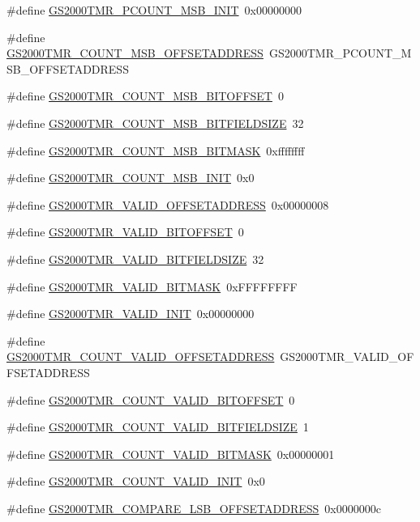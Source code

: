 \begin{DoxyCompactItemize}
\item 
\#define \hyperlink{a00556_aa39d9eade4210f59cf6828090fa58557}{GS2000TMR\_\-PCOUNT\_\-MSB\_\-INIT}~0x00000000
\item 
\#define \hyperlink{a00556_ad193092e1c4d20b72ce84f50c8e551c9}{GS2000TMR\_\-COUNT\_\-MSB\_\-OFFSETADDRESS}~GS2000TMR\_\-PCOUNT\_\-MSB\_\-OFFSETADDRESS
\item 
\#define \hyperlink{a00556_a5053f552dc3042575a61fa80cef0ed3a}{GS2000TMR\_\-COUNT\_\-MSB\_\-BITOFFSET}~0
\item 
\#define \hyperlink{a00556_ab89ff4e77dde1124c1d7d03d6a63b051}{GS2000TMR\_\-COUNT\_\-MSB\_\-BITFIELDSIZE}~32
\item 
\#define \hyperlink{a00556_a170d13990b2af824f361f5be63952c7e}{GS2000TMR\_\-COUNT\_\-MSB\_\-BITMASK}~0xffffffff
\item 
\#define \hyperlink{a00556_af41c5c250f6bf3c7a6eae0c9c0265d4c}{GS2000TMR\_\-COUNT\_\-MSB\_\-INIT}~0x0
\item 
\#define \hyperlink{a00556_a498c965135be6d53c8376d963b3ea397}{GS2000TMR\_\-VALID\_\-OFFSETADDRESS}~0x00000008
\item 
\#define \hyperlink{a00556_a38f4ead0a7a7c7c6d6c0b67639959448}{GS2000TMR\_\-VALID\_\-BITOFFSET}~0
\item 
\#define \hyperlink{a00556_a51308a022f1b23df77176891ff1b5b69}{GS2000TMR\_\-VALID\_\-BITFIELDSIZE}~32
\item 
\#define \hyperlink{a00556_a401443ee48bc25d3d8558995733b9af3}{GS2000TMR\_\-VALID\_\-BITMASK}~0xFFFFFFFF
\item 
\#define \hyperlink{a00556_a38a287d9a725b243fa36e9adebc14813}{GS2000TMR\_\-VALID\_\-INIT}~0x00000000
\item 
\#define \hyperlink{a00556_a74bcf4319937bc95f065b1737d5af8d7}{GS2000TMR\_\-COUNT\_\-VALID\_\-OFFSETADDRESS}~GS2000TMR\_\-VALID\_\-OFFSETADDRESS
\item 
\#define \hyperlink{a00556_ae124a41f4de98afc3d08c1596a2d02cb}{GS2000TMR\_\-COUNT\_\-VALID\_\-BITOFFSET}~0
\item 
\#define \hyperlink{a00556_aed56179f4b6211fbb927f53447a4f988}{GS2000TMR\_\-COUNT\_\-VALID\_\-BITFIELDSIZE}~1
\item 
\#define \hyperlink{a00556_a81168bce7a2231e6b00e9e641316ec5d}{GS2000TMR\_\-COUNT\_\-VALID\_\-BITMASK}~0x00000001
\item 
\#define \hyperlink{a00556_a460f087aac9cb1d8f41fd9f0e90771af}{GS2000TMR\_\-COUNT\_\-VALID\_\-INIT}~0x0
\item 
\#define \hyperlink{a00556_aebafe9d850fad2778511fddeddd011a0}{GS2000TMR\_\-COMPARE\_\-LSB\_\-OFFSETADDRESS}~0x0000000c

\end{DoxyCompactItemize}
